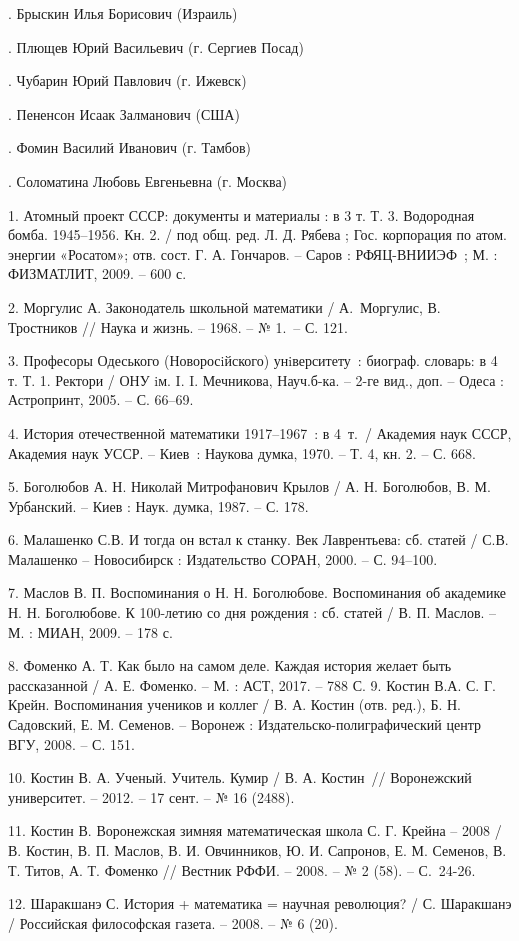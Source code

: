 .	Брыскин Илья Борисович (Израиль)

.	Плющев Юрий Васильевич (г. Сергиев Посад)

.	Чубарин Юрий Павлович (г. Ижевск)

.	Пененсон Исаак Залманович (США)

.	Фомин Василий Иванович (г. Тамбов)

.	Соломатина Любовь Евгеньевна (г. Москва)


\litlist

1.	Атомный проект СССР: документы и материалы : в 3 т. Т. 3. Водородная бомба. 1945–1956. Кн. 2. / под общ. ред. Л. Д. Рябева ; Гос. корпорация по атом. энергии «Росатом»; отв. сост. Г. А. Гончаров. – Саров : РФЯЦ-ВНИИЭФ~; М. : ФИЗМАТЛИТ, 2009. – 600 с.

2.	Моргулис А. Законодатель школьной математики / А.~Моргулис, В. Тростников // Наука и жизнь. – 1968. – № 1.~– С. 121.

3.	Професоры Одеського (Новоросiйского) унiверситету~: биограф. словарь:  в 4 т. Т. 1. Ректори / ОНУ iм. I. I. Мечникова, Науч.б-ка. – 2-ге вид., доп. – Одеса : Астропринт, 2005. – С. 66–69.

4.	История отечественной математики 1917–1967~: в 4~т.~/ Академия наук СССР, Академия наук УССР. – Киев~: Наукова думка, 1970. – Т. 4, кн. 2. – С. 668.

5.	Боголюбов А. Н. Николай Митрофанович Крылов / А. Н. Боголюбов, В. М. Урбанский. – Киев : Наук. думка, 1987. – С. 178.

6.	Малашенко С.В. И тогда он встал к станку. Век Лаврентьева: сб. статей / С.В. Малашенко – Новосибирск : Издательство СОРАН, 2000. –  С. 94–100.

7.	Маслов В. П. Воспоминания о Н. Н. Боголюбове. Воспоминания об академике Н. Н. Боголюбове. К 100-летию со дня рождения : сб. статей / В. П. Маслов. – М. : МИАН, 2009. – 178 с.

8.	Фоменко А. Т. Как было на самом деле. Каждая история желает быть рассказанной / А. Е. Фоменко. – М. : АСТ, 2017. – 788 С.
9.	Костин В.А.  С. Г. Крейн. Воспоминания учеников и коллег / В. А. Костин (отв. ред.), Б. Н. Садовский, Е. М. Семенов. – Воронеж : Издательско-полиграфический центр ВГУ, 2008. – С. 151.

10.	Костин В. А. Ученый. Учитель. Кумир / В. А. Костин~// Воронежский университет. – 2012. – 17 сент. – № 16 (2488).

11.	Костин В. Воронежская зимняя математическая школа С. Г. Крейна – 2008 / В. Костин, В. П. Маслов, В. И. Овчинников, Ю. И. Сапронов, Е. М. Семенов, В. Т. Титов, А. Т. Фоменко // Вестник РФФИ. – 2008. – № 2 (58). – С.~24-26.

12.	Шаракшанэ С. История + математика = научная революция? / С. Шаракшанэ / Российская философская газета. – 2008. – № 6 (20).

